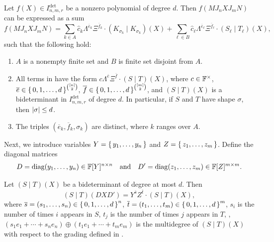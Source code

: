 \documentclass[letterpaper, 11pt]{amsart}
\begin{document}
\begin{cor}\label{cor:reformuated}
  Let $f(X) \in I^{\det}_{n, m, r}$
  be a nonzero polynomial of degree $d$.
  Then $f(M J_n X J_m N)$ can be expressed as a sum
  \begin{equation}\label{eq:expansion3}
          f(M J_n X J_m N) = \sum_{k \in A} \widehat{c}_{k} \Lambda^{\overline{e}_k}\Xi^{\overline{f}_k}\cdot (K_{\sigma_k}\mid K_{\sigma_k})(X) + \sum_{\ell \in B} \widehat{c}_{\ell} \Lambda^{\overline{e}_\ell}\Xi^{\overline{f}_\ell}\cdot (S_\ell\mid T_\ell)(X),
      \end{equation}
  such that the following hold:
  \begin{enumerate}
      \item\label{item:expansion3_i0} $A$ is a nonempty finite set and $B$ is finite set disjoint from $A$.
      \item\label{item:expansion3_i1} All terms in  have the form $c \Lambda^{\overline{e}}\Xi^{\overline{f}}\cdot (S\mid T)(X)$, where $c\in \mathbb{F}^\times$, $\overline{e}\in \set{0,1,\dots,d }^{\binom{[n]}{2}}$, $\overline{f}\in \set{0,1,\dots,d}^{\binom{[m]}{2}}$,
      and $(S\mid T)(X)$ is a bideterminant in $I^{\det}_{n, m, r}$ of degree $d$.
      In particular, if $S$ and $T$ have shape $\sigma$, then $\abs{\sigma} \leq d$.
      \item\label{item:expansion3_i2} The triples $(\overline{e}_k,\overline{f}_k,\sigma_k)$ are distinct, where $k$ ranges over $A$.
  \end{enumerate}
\end{cor}

Next, we introduce variables $Y = \set{y_1,\dots,y_n}$ and $Z = \set{z_1,\dots,z_m}$.
Define the diagonal matrices
\[
    D = \mathrm{diag}(y_1,\dots,y_n)\in\mathbb{F}[Y]^{n\times n} \quad\text{and}\quad D'=\mathrm{diag}(z_1,\dots,z_m)\in\mathbb{F}[Z]^{m\times m}.
\]

\begin{lem}\label{lem:diagonals}
Let $(S\mid T)(X)$ be a bideterminant of degree at most $d$.
Then
\[
  (S\mid T)(D X D')=Y^{\overline{s}} Z^{\overline{t}}\cdot  (S\mid T)(X),
\]
where $\overline{s}=(s_1,\dots,s_n)\in \set{0,1,\dots,d}^n$, $\overline{t}=(t_1,\dots,t_m)\in \set{0,1,\dots,d}^m$, $s_i$ is the number of times $i$ appears in $S$, $t_j$ is the number of times $j$ appears in $T$, \ie, $(s_1 e_1+ \cdots + s_n e_n)\oplus (t_1 e_1 + \cdots + t_m e_m)$ is the multidegree of $(S\mid T)(X)$ with respect to the grading defined in .
\end{lem}
\end{document}
